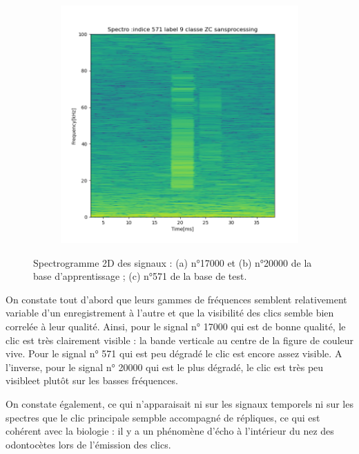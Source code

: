 \begin{figure}[!h]
\begin{subfigure}[b]{0.3\textwidth}
    \caption{}
  \end{subfigure}
  \begin{subfigure}[b]{0.3\textwidth}
    \includegraphics[width=\textwidth]{./images/indice571Spectro2Dlabel9classeZCsansprocessingsanszoom.png}
    \caption{}
  \end{subfigure}
  \caption{Spectrogramme 2D des signaux : (a) n°17000 et (b) n°20000 de la base d'apprentissage ; (c) n°571 de la base de test.%
  \label{fig:spectros2D}}
\end{figure}

On constate tout d'abord  que leurs gammes de fréquences semblent relativement variable d'un enregistrement à l'autre et que la visibilité des clics semble bien correlée à leur qualité.
Ainsi, pour le signal n° 17000 qui est de bonne qualité, le clic est très clairement visible : la bande verticale au centre de la figure de couleur vive.
Pour le signal n° 571 qui est peu dégradé le clic est encore assez visible.
A l'inverse, pour le signal n° 20000 qui est le plus dégradé, le clic est très peu visibleet plutôt sur les basses fréquences.

On constate également, ce qui n'apparaisait ni sur les signaux temporels ni sur les spectres que le clic principale sempble accompagné de répliques, ce qui est cohérent avec la biologie : il y a un phénomène d'écho à l'intérieur du nez des odontocètes lors de l'émission des clics.

